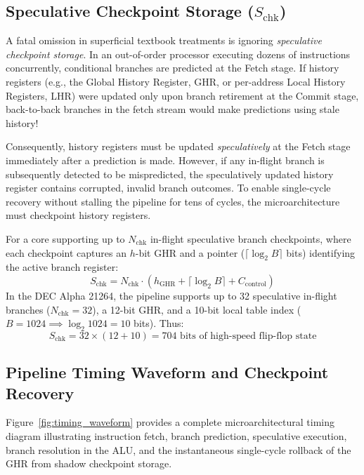 \documentclass[11pt,a4paper]{article}
\begin{document}
\subsection{Speculative Checkpoint Storage ($S_{\text{chk}}$)}
A fatal omission in superficial textbook treatments is ignoring \textit{speculative checkpoint storage}. In an out-of-order processor executing dozens of instructions concurrently, conditional branches are predicted at the Fetch stage. If history registers (e.g., the Global History Register, GHR, or per-address Local History Registers, LHR) were updated only upon branch retirement at the Commit stage, back-to-back branches in the fetch stream would make predictions using stale history!

Consequently, history registers must be updated \textit{speculatively} at the Fetch stage immediately after a prediction is made. However, if any in-flight branch is subsequently detected to be mispredicted, the speculatively updated history register contains corrupted, invalid branch outcomes. To enable single-cycle recovery without stalling the pipeline for tens of cycles, the microarchitecture must checkpoint history registers.

For a core supporting up to $N_{\text{chk}}$ in-flight speculative branch checkpoints, where each checkpoint captures an $h$-bit GHR and a pointer ($\lceil \log_2 B \rceil$ bits) identifying the active branch register:
\begin{equation}
    S_{\text{chk}} = N_{\text{chk}} \cdot \left( h_{\text{GHR}} + \lceil \log_2 B \rceil + C_{\text{control}} \right)
    \label{eq:s_chk}
\end{equation}
In the DEC Alpha 21264, the pipeline supports up to 32 speculative in-flight branches ($N_{\text{chk}} = 32$), a 12-bit GHR, and a 10-bit local table index ($B = 1024 \implies \log_2 1024 = 10$ bits). Thus:
\begin{equation}
    S_{\text{chk}} = 32 \times (12 + 10) = 704 \text{ bits of high-speed flip-flop state}
\end{equation}

\subsection{Pipeline Timing Waveform and Checkpoint Recovery}
Figure~\ref{fig:timing_waveform} provides a complete microarchitectural timing diagram illustrating instruction fetch, branch prediction, speculative execution, branch resolution in the ALU, and the instantaneous single-cycle rollback of the GHR from shadow checkpoint storage.
\end{document}
